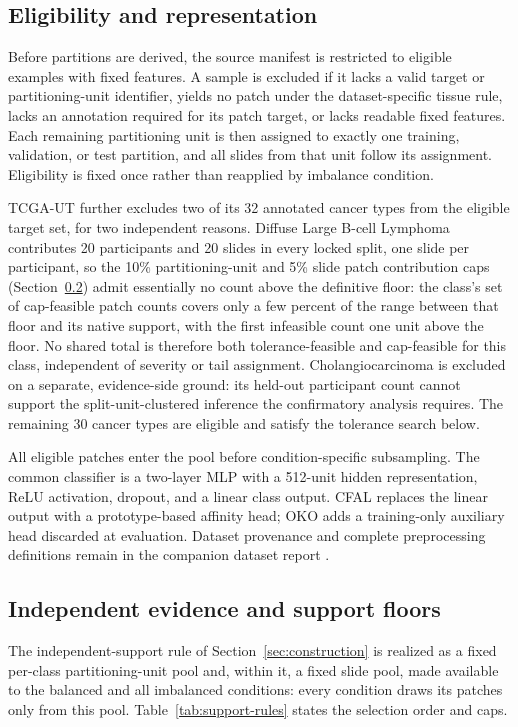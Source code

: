 \documentclass[11pt]{article}
\begin{document}
\subsection{Eligibility and representation}
Before partitions are derived, the source manifest is restricted to eligible examples with fixed features. A sample is excluded if it lacks a valid target or partitioning-unit identifier, yields no patch under the dataset-specific tissue rule, lacks an annotation required for its patch target, or lacks readable fixed features. Each remaining partitioning unit is then assigned to exactly one training, validation, or test partition, and all slides from that unit follow its assignment. Eligibility is fixed once rather than reapplied by imbalance condition.

TCGA-UT further excludes two of its 32 annotated cancer types from the eligible target set, for two independent reasons. Diffuse Large B-cell Lymphoma contributes 20 participants and 20 slides in every locked split, one slide per participant, so the 10\% partitioning-unit and 5\% slide patch contribution caps (Section~\ref{app:construction-support}) admit essentially no count above the definitive floor: the class's set of cap-feasible patch counts covers only a few percent of the range between that floor and its native support, with the first infeasible count one unit above the floor. No shared total is therefore both tolerance-feasible and cap-feasible for this class, independent of severity or tail assignment. Cholangiocarcinoma is excluded on a separate, evidence-side ground: its held-out participant count cannot support the split-unit-clustered inference the confirmatory analysis requires. The remaining 30 cancer types are eligible and satisfy the tolerance search below.

All eligible patches enter the pool before condition-specific subsampling. The common classifier is a two-layer MLP with a 512-unit hidden representation, ReLU activation, dropout, and a linear class output. CFAL replaces the linear output with a prototype-based affinity head; OKO adds a training-only auxiliary head discarded at evaluation. Dataset provenance and complete preprocessing definitions remain in the companion dataset report \citep{queisler2026datasets}.

\subsection{Independent evidence and support floors}
\label{app:construction-support}
The independent-support rule of Section~\ref{sec:construction} is realized as a fixed per-class partitioning-unit pool and, within it, a fixed slide pool, made available to the balanced and all imbalanced conditions: every condition draws its patches only from this pool. Table~\ref{tab:support-rules} states the selection order and caps.
\end{document}
